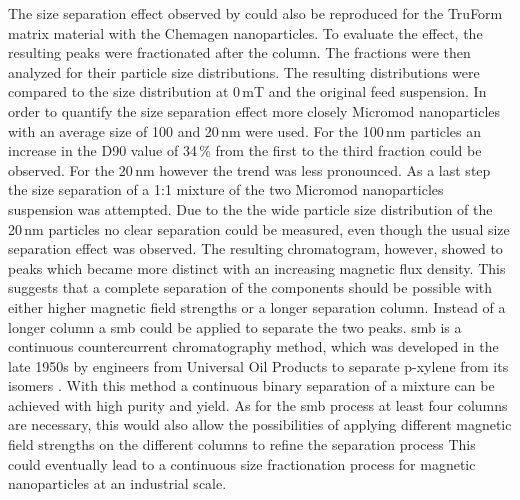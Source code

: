 The size separation effect observed by \cite{AndreMaster} could also be reproduced for the TruForm matrix material with the Chemagen nanoparticles. To evaluate the effect, the resulting peaks were fractionated after the column. The fractions were then analyzed for their particle size distributions. The resulting distributions were compared to the size distribution at 0\,mT and the original feed suspension. In order to quantify the size separation effect more closely Micromod nanoparticles with an average size of 100 and 20\,nm were used. For the 100\,nm particles an increase in the D90 value of 34\,\% from the first to the third fraction could be observed. For the 20\,nm however the trend was less pronounced. As a last step the size separation of a 1:1 mixture of the two Micromod nanoparticles suspension was attempted. Due to the the wide particle size distribution of the 20\,nm particles no clear separation could be measured, even though the usual size separation effect was observed. The resulting chromatogram, however, showed to peaks which became more distinct with an increasing magnetic flux density. This suggests that a complete separation of the components should be possible with either higher magnetic field strengths or a longer separation column. Instead of a longer column a \gls{smb} could be applied to separate the two peaks. \Gls{smb} is a continuous countercurrent chromatography method, which was developed in the late 1950s by engineers from Universal Oil Products to separate p-xylene from its isomers \cite{broughton1961continuous,carson1962rotary}. With this method a continuous binary separation of a mixture can be achieved with high purity and yield. As for the \gls{smb} process at least four columns are necessary, this would also allow the possibilities of applying different magnetic field strengths on the different columns to refine the separation process  This could eventually lead to a continuous size fractionation process for magnetic nanoparticles at an industrial scale.  
  